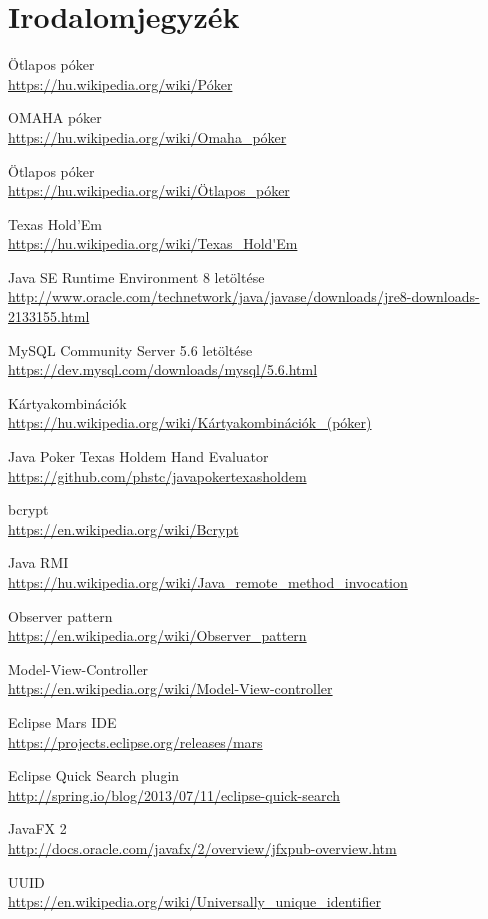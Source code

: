 \part{Irodalomjegyzék}

\begin{thebibliography}{9}

Ötlapos póker \\
\url{https://hu.wikipedia.org/wiki/Póker}

OMAHA póker \\
\url{https://hu.wikipedia.org/wiki/Omaha_póker}

Ötlapos póker \\
\url{https://hu.wikipedia.org/wiki/Ötlapos_póker}

Texas Hold'Em \\
\url{https://hu.wikipedia.org/wiki/Texas_Hold'Em}

Java SE Runtime Environment 8 letöltése \\
\url{http://www.oracle.com/technetwork/java/javase/downloads/jre8-downloads-2133155.html}

MySQL Community Server 5.6 letöltése \\
\url{https://dev.mysql.com/downloads/mysql/5.6.html}

Kártyakombinációk \\
\url{https://hu.wikipedia.org/wiki/Kártyakombinációk_(póker)}

Java Poker Texas Holdem Hand Evaluator \\
\url{https://github.com/phstc/javapokertexasholdem}

bcrypt \\
\url{https://en.wikipedia.org/wiki/Bcrypt}

Java RMI \\
\url{https://hu.wikipedia.org/wiki/Java_remote_method_invocation}

Observer pattern \\
\url{https://en.wikipedia.org/wiki/Observer_pattern}

Model-View-Controller \\
\url{https://en.wikipedia.org/wiki/Model-View-controller}

Eclipse Mars IDE \\
\url{https://projects.eclipse.org/releases/mars}

Eclipse Quick Search plugin \\
\url{http://spring.io/blog/2013/07/11/eclipse-quick-search}

JavaFX 2 \\
\url{http://docs.oracle.com/javafx/2/overview/jfxpub-overview.htm}

UUID \\
\url{https://en.wikipedia.org/wiki/Universally_unique_identifier}



\end{thebibliography}
